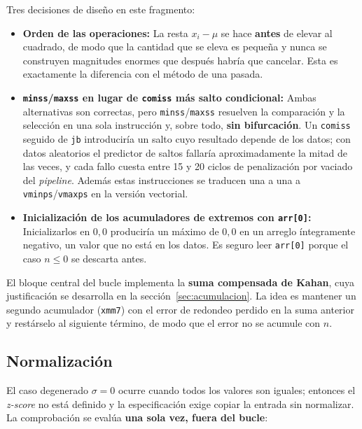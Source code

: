 \documentclass[journal]{IEEEtran}
\begin{document}
Tres decisiones de diseño en este fragmento:
\begin{itemize}
    \item \textbf{Orden de las operaciones:} La resta $x_i - \mu$ se hace
        \textbf{antes} de elevar al cuadrado, de modo que la cantidad que se eleva
        es pequeña y nunca se construyen magnitudes enormes que después
        habría que cancelar. Esta es exactamente la diferencia con el método
        de una pasada.
    \item \textbf{\texttt{minss}/\texttt{maxss} en lugar de \texttt{comiss} más
        salto condicional:} Ambas alternativas son correctas, pero
        \texttt{minss}/\texttt{maxss} resuelven la comparación y la selección
        en una sola instrucción y, sobre todo, \textbf{sin bifurcación}. Un
        \texttt{comiss} seguido de \texttt{jb} introduciría un salto cuyo
        resultado depende de los datos; con datos aleatorios el predictor de
        saltos fallaría aproximadamente la mitad de las veces, y cada fallo
        cuesta entre 15 y 20 ciclos de penalización por vaciado del
        \textit{pipeline}. Además estas instrucciones se traducen una a una a
        \texttt{vminps}/\texttt{vmaxps} en la versión vectorial.
    \item \textbf{Inicialización de los acumuladores de extremos con
        \texttt{arr[0]}:} Inicializarlos en $0,0$ produciría un máximo de
        $0,0$ en un arreglo íntegramente negativo, un valor que no está en
        los datos. Es seguro leer \texttt{arr[0]} porque el caso $n \le 0$ se
        descarta antes.
\end{itemize}

El bloque central del bucle implementa la \textbf{suma compensada de
Kahan}, cuya justificación se desarrolla en la
sección~\ref{sec:acumulacion}. La idea es mantener un segundo
acumulador (\texttt{xmm7}) con el error de redondeo perdido en la suma
anterior y restárselo al siguiente término, de modo que el error no se
acumule con $n$.

\subsection{Normalización}

El caso degenerado $\sigma = 0$ ocurre cuando todos los valores son
iguales; entonces el \textit{z-score} no está definido y la
especificación exige copiar la entrada sin normalizar. La comprobación
se evalúa \textbf{una sola vez, fuera del bucle}:
\end{document}

